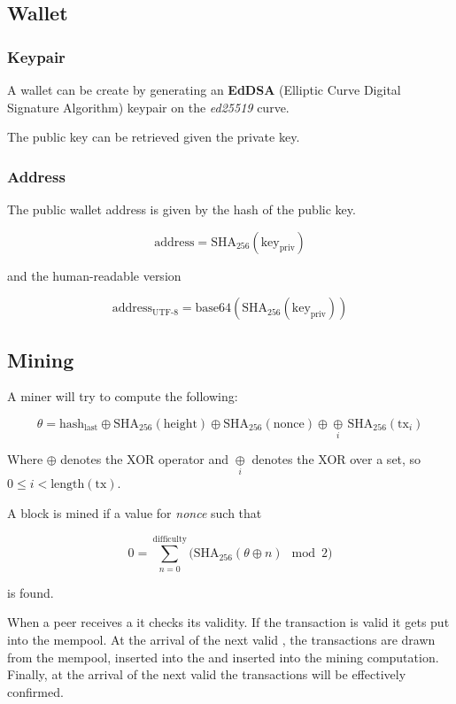 \documentclass[../documentation.tex]{subfiles}
\begin{document}
\pagebreak

\subsection{Wallet}

\subsubsection{Keypair}

A wallet can be create by generating an \textbf{EdDSA}
(Elliptic Curve Digital Signature Algorithm) keypair
on the \textit{ed25519} curve.

The public key can be retrieved given the private key.

\subsubsection{Address}

The public wallet address is given by the hash of the public key.

\[
    \text{address}=\text{SHA}_{256}(\text{key}_\text{priv})
\]

and the human-readable version

\[
    \text{address}_\text{UTF-8}=\text{base64}(\text{SHA}_{256}(\text{key}_\text{priv}))
\]

\subsection{Mining}

A miner will try to compute the following:

\[
    \theta =
    \text{hash}_\text{last}
    \oplus
    \text{SHA}_{256}(\text{height})
    \oplus
    \text{SHA}_{256}(\text{nonce})
    \oplus
    \underset{i}{\oplus}\,
    \text{SHA}_{256}(\text{tx}_i)
\]

Where \(\oplus\) denotes the XOR operator and 
\(\underset{i}{\oplus}\) denotes the XOR over a set,
so \(0 \leq i < \text{length}(\text{tx})\).

A block is mined if a value for \textit{nonce} such that

\[
    0 = \sum_{n=0}^{\text{difficulty}}
    \Big(
        \text{SHA}_{256}(\theta \oplus n) \mod{2}
    \Big)
\]

is found.

When a peer receives a  it checks its validity.
If the transaction is valid it gets put into the mempool.
At the arrival of the next valid , the transactions
are drawn from the mempool, inserted into the and inserted into the mining computation.
Finally, at the arrival of the next valid 
the transactions will be effectively confirmed.
\end{document}
